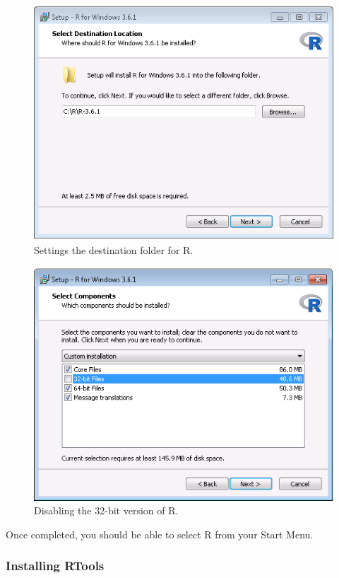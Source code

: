 \documentclass[11pt]{book}
\theoremstyle{definition}
\theoremstyle{definition}
\theoremstyle{definition}
\theoremstyle{remark}
\begin{document}
\begin{figure}

{\centering \includegraphics[width=0.8\linewidth]{images/OhdsiAnalyticsTools/rDestination} 

}

\caption{Settings the destination folder for R.}\label{fig:rDestination}
\end{figure}

\begin{figure}

{\centering \includegraphics[width=0.8\linewidth]{images/OhdsiAnalyticsTools/no32Bits} 

}

\caption{Disabling the 32-bit version of R.}\label{fig:no32Bits}
\end{figure}

Once completed, you should be able to select R from your Start Menu.

\subsubsection*{Installing RTools}\label{installing-rtools}
\end{document}
